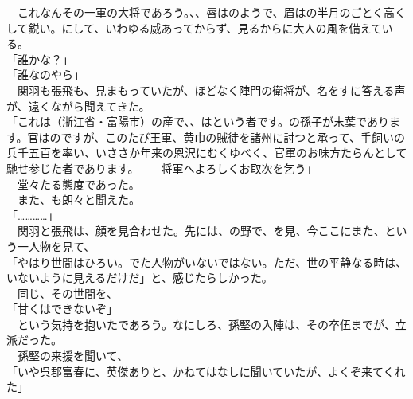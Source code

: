 \documentclass[
  paper=a5,
  fontsize=10pt,
  jafontsize=9.5pt,
  tate,                  %
  open_bracket_pos=nibu, %
]{jlreq}
\begin{document}
　これなんその一軍の大将であろう。、、唇はのようで、眉はの半月のごとく高くして鋭い。にして、いわゆる威あってからず、見るからに大人の風を備えている。\\


「誰かな？」\\


「誰なのやら」\\


　関羽も張飛も、見まもっていたが、ほどなく陣門の衛将が、名をすに答える声が、遠くながら聞えてきた。\\


「これは（浙江省・富陽市）の産で、、はという者です。の孫子が末葉であります。官はのですが、このたび王軍、黄巾の賊徒を諸州に討つと承って、手飼いの兵千五百を率い、いささか年来の恩沢にむくゆべく、官軍のお味方たらんとして馳せ参じた者であります。――将軍へよろしくお取次を乞う」\\


　堂々たる態度であった。\\


　また、も朗々と聞えた。\\


「…………」\\


　関羽と張飛は、顔を見合わせた。先には、の野で、を見、今ここにまた、という一人物を見て、\\


「やはり世間はひろい。でた人物がいないではない。ただ、世の平静なる時は、いないように見えるだけだ」と、感じたらしかった。\\


　同じ、その世間を、\\


「甘くはできないぞ」\\


　という気持を抱いたであろう。なにしろ、孫堅の入陣は、その卒伍までが、立派だった。\\


　孫堅の来援を聞いて、\\


「いや呉郡富春に、英傑ありと、かねてはなしに聞いていたが、よくぞ来てくれた」\\
\end{document}
